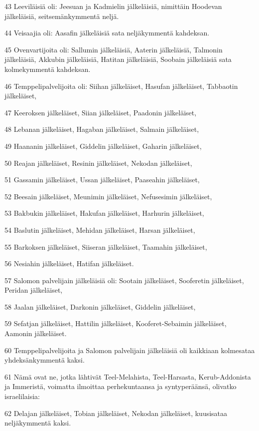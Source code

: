 \par 43 Leeviläisiä oli: Jeesuan ja Kadmielin jälkeläisiä, nimittäin Hoodevan jälkeläisiä, seitsemänkymmentä neljä.
\par 44 Veisaajia oli: Aasafin jälkeläisiä sata neljäkymmentä kahdeksan.
\par 45 Ovenvartijoita oli: Sallumin jälkeläisiä, Aaterin jälkeläisiä, Talmonin jälkeläisiä, Akkubin jälkeläisiä, Hatitan jälkeläisiä, Soobain jälkeläisiä sata kolmekymmentä kahdeksan.
\par 46 Temppelipalvelijoita oli: Siihan jälkeläiset, Hasufan jälkeläiset, Tabbaotin jälkeläiset,
\par 47 Keeroksen jälkeläiset, Siian jälkeläiset, Paadonin jälkeläiset,
\par 48 Lebanan jälkeläiset, Hagaban jälkeläiset, Salmain jälkeläiset,
\par 49 Haananin jälkeläiset, Giddelin jälkeläiset, Gaharin jälkeläiset,
\par 50 Reajan jälkeläiset, Resinin jälkeläiset, Nekodan jälkeläiset,
\par 51 Gassamin jälkeläiset, Ussan jälkeläiset, Paaseahin jälkeläiset,
\par 52 Beesain jälkeläiset, Meunimin jälkeläiset, Nefusesimin jälkeläiset,
\par 53 Bakbukin jälkeläiset, Hakufan jälkeläiset, Harhurin jälkeläiset,
\par 54 Baslutin jälkeläiset, Mehidan jälkeläiset, Harsan jälkeläiset,
\par 55 Barkoksen jälkeläiset, Siiseran jälkeläiset, Taamahin jälkeläiset,
\par 56 Nesiahin jälkeläiset, Hatifan jälkeläiset.
\par 57 Salomon palvelijain jälkeläisiä oli: Sootain jälkeläiset, Sooferetin jälkeläiset, Peridan jälkeläiset,
\par 58 Jaalan jälkeläiset, Darkonin jälkeläiset, Giddelin jälkeläiset,
\par 59 Sefatjan jälkeläiset, Hattilin jälkeläiset, Kooferet-Sebaimin jälkeläiset, Aamonin jälkeläiset.
\par 60 Temppelipalvelijoita ja Salomon palvelijain jälkeläisiä oli kaikkiaan kolmesataa yhdeksänkymmentä kaksi.
\par 61 Nämä ovat ne, jotka lähtivät Teel-Melahista, Teel-Harsasta, Kerub-Addonista ja Immeristä, voimatta ilmoittaa perhekuntaansa ja syntyperäänsä, olivatko israelilaisia:
\par 62 Delajan jälkeläiset, Tobian jälkeläiset, Nekodan jälkeläiset, kuusisataa neljäkymmentä kaksi.
